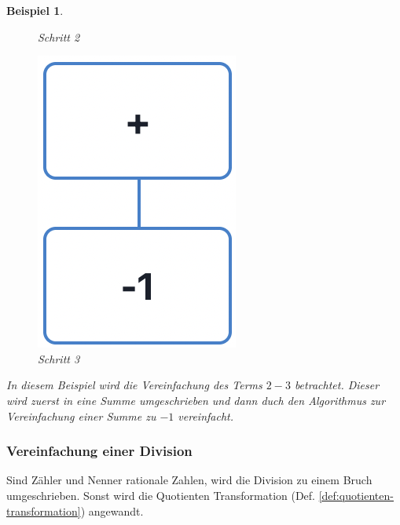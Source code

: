 \documentclass[11pt]{article}
\newcommand{\lab}[1]{(Def. \ref{#1})}
\newtheorem{example}{Beispiel}
\begin{document}
\begin{example}
\begin{figure}[h]
\begin{minipage}{.5\textwidth}
      \caption{Schritt 2}
    \end{minipage}
  \end{figure}
  \begin{figure}[h]
    \centering
    \includegraphics[scale=0.4]{trees/difference/beispiel_1_3.png}
    \caption{Schritt 3}
  \end{figure}
  In diesem Beispiel wird die Vereinfachung des Terms $2-3$ betrachtet. Dieser wird zuerst in eine Summe
  umgeschrieben und dann duch den Algorithmus zur Vereinfachung einer Summe zu $-1$ vereinfacht.
\end{example}

\subsubsection{Vereinfachung einer Division}
Sind Zähler und Nenner rationale Zahlen, wird die Division zu einem Bruch umgeschrieben.
Sonst wird die Quotienten Transformation \lab{def:quotienten-transformation} angewandt.
\end{document}
